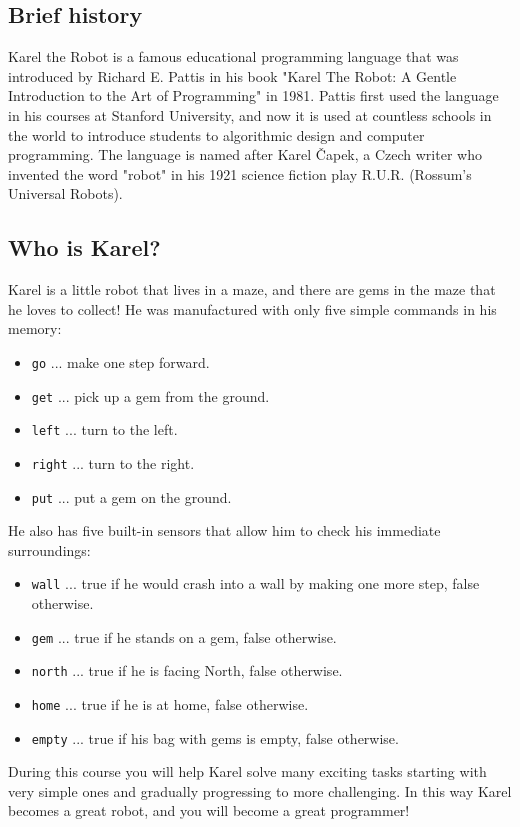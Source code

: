\documentclass[article,A4,12pt]{llncs}
\begin{document}
\subsection{Brief history}

Karel the Robot is a famous educational programming language that was introduced by Richard E. 
Pattis in his book "Karel The Robot: A Gentle Introduction to the Art of Programming" in 1981. 
Pattis first used the language in his courses at Stanford University, and now it is used at 
countless schools in the world to introduce students to algorithmic design and computer programming. 
The language is named after Karel \v{C}apek, a Czech writer who invented the word "robot" in his 1921 
science fiction play R.U.R. (Rossum's Universal Robots).

\subsection{Who is Karel?}

Karel is a little robot that lives in a maze, and there are gems in the maze that he loves to collect!
He was manufactured with only five simple commands in his memory:
\begin{itemize}
\item {\color{green} \tt go} ... make one step forward.
\item {\color{green} \tt get} ... pick up a gem from the ground. 
\item {\color{green} \tt left} ... turn to the left.
\item {\color{green} \tt right} ... turn to the right. 
\item {\color{green} \tt put} ... put a gem on the ground. 
\end{itemize}
He also has five built-in sensors that allow him to check his immediate surroundings:
\begin{itemize}
\item {\color{green} \tt wall} ... true if he would crash into a wall by making one more step, false otherwise. 
\item {\color{green} \tt gem} ... true if he stands on a gem, false otherwise.
\item {\color{green} \tt north} ... true if he is facing North, false otherwise.
\item {\color{green} \tt home} ... true if he is at home, false otherwise.
\item {\color{green} \tt empty} ... true if his bag with gems is empty, false otherwise. 
\end{itemize}
During this course you will help Karel solve many exciting tasks starting with very simple ones and 
gradually progressing to more challenging. In this way Karel becomes a great robot, and you 
will become a great programmer!
\end{document}
